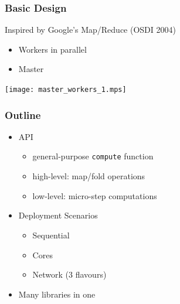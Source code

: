 \documentclass[xcolor=dvipsnames]{beamer}
\begin{document}

\begin{frame}\frametitle {Basic Design}

Inspired by Google's Map/Reduce (OSDI 2004)

\begin{itemize}
\item Workers in parallel
\item Master
\end{itemize}

\begin{center}
  \texttt{[image: master\_workers\_1.mps]}  
\end{center}
\end{frame}


\begin{frame}\frametitle{Outline}
    \begin{itemize}
    \item API
      \begin{itemize}
      \item general-purpose \texttt{compute} function
      \item high-level: map/fold operations
      \item low-level: micro-step computations
      \end{itemize}


\bigskip
    \item Deployment Scenarios
      \begin{itemize}
      \item Sequential
      \item Cores
      \item Network (3 flavours)
      \end{itemize}


\bigskip
    \item Many libraries in one

    \end{itemize}

\end{frame}

\end{document}
